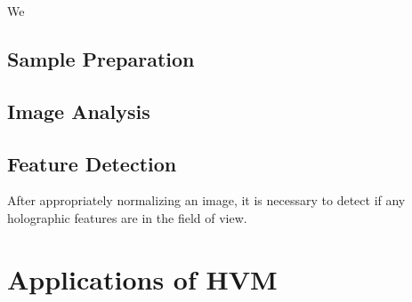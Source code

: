We


\subsection{Sample Preparation}




\subsection{Image Analysis}


\subsection{Feature Detection}

After appropriately normalizing an image, it is necessary to detect if any holographic
features are in the field of view. 


\section{Applications of HVM}

